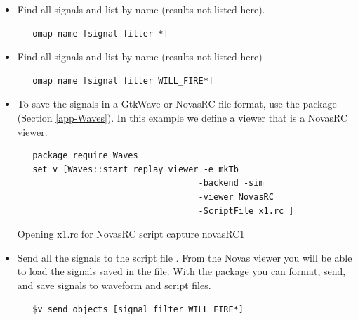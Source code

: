 \begin{itemize}

\item Find all signals and list by name (results not listed here).
\begin{verbatim}
   omap name [signal filter *]
\end{verbatim}

\item  Find all  signals and list by name (results not
listed here)

\begin{verbatim}
   omap name [signal filter WILL_FIRE*]
\end{verbatim}

\item To save the signals in a GtkWave or NovasRC file format, use the
 package (Section \ref{app-Waves}).
In this example we define a viewer  that is a NovasRC viewer.

\begin{verbatim}
   package require Waves
   set v [Waves::start_replay_viewer -e mkTb 
                                    -backend -sim 
                                    -viewer NovasRC 
                                    -ScriptFile x1.rc ]
\end{verbatim}

\begin{codebox}
Opening x1.rc for NovasRC script capture
novasRC1
\end{codebox}

\item Send all the  signals to the script file
.  From the Novas viewer you will be able to load the
signals saved in the 
 file.  With the  package you can format, send,
and save signals to waveform and script files.
\begin{verbatim}
   $v send_objects [signal filter WILL_FIRE*]
\end{verbatim}

\end{itemize}


